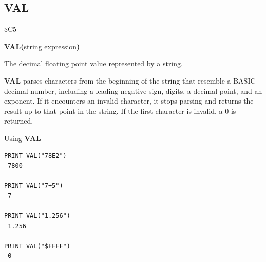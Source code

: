 \subsection{VAL}
\begin{description}[leftmargin=2cm,style=nextline]
\item [Token:]    \$C5

\item [Format:]   {\bf VAL(}string expression{\bf)}

\item [Returns:]  The decimal floating point value represented by a string.

\item [Remarks:]  {\bf VAL} parses characters from the beginning of the string that resemble a BASIC decimal number, including a leading negative sign, digits, a decimal point, and an exponent. If it encounters an invalid character, it stops parsing and returns the result up to that point in the string. If the first character is invalid, a 0 is returned.

\item [Example:]  Using {\bf VAL}

\begin{tcolorbox}[colback=black,coltext=white]
\verbatimfont{\codefont}
\begin{verbatim}
PRINT VAL("78E2")
 7800

PRINT VAL("7+5")
 7

PRINT VAL("1.256")
 1.256

PRINT VAL("$FFFF")
 0
\end{verbatim}
\end{tcolorbox}
\end{description}


\newpage
